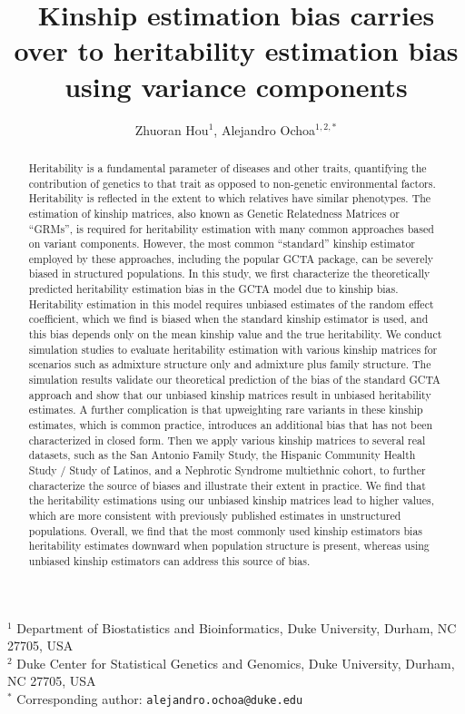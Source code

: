 \documentclass[11pt]{article}
\title{\Large \textbf{Kinship estimation bias carries over to heritability estimation bias using variance components}}
\author{Zhuoran Hou$^1$, Alejandro Ochoa$^{1,2,*}$}
\date{}
\begin{document}
\maketitle

\noindent
$^1$ Department of Biostatistics and Bioinformatics, Duke University, Durham, NC 27705, USA \\
$^2$ Duke Center for Statistical Genetics and Genomics, Duke University, Durham, NC 27705, USA \\
$^*$ Corresponding author: \texttt{alejandro.ochoa@duke.edu}


\begin{abstract}
Heritability is a fundamental parameter of diseases and other traits, quantifying the contribution of genetics to that trait as opposed to non-genetic environmental factors. Heritability is reflected in the extent to which relatives have similar phenotypes. The estimation of kinship matrices, also known as Genetic Relatedness Matrices or “GRMs”, is required for heritability estimation with many common approaches based on variant components. However, the most common “standard” kinship estimator employed by these approaches, including the popular GCTA package, can be severely biased in structured populations. In this study, we first characterize the theoretically predicted heritability estimation bias in the GCTA model due to kinship bias. Heritability estimation in this model requires unbiased estimates of the random effect coefficient, which we find is biased when the standard kinship estimator is used, and this bias depends only on the mean kinship value and the true heritability. We conduct simulation studies to evaluate heritability estimation with various kinship matrices for scenarios such as admixture structure only and admixture plus family structure. The simulation results validate our theoretical prediction of the bias of the standard GCTA approach and show that our unbiased kinship matrices result in unbiased heritability estimates. A further complication is that upweighting rare variants in these kinship estimates, which is common practice, introduces an additional bias that has not been characterized in closed form.  Then we apply various kinship matrices to several real datasets, such as the San Antonio Family Study, the Hispanic Community Health Study / Study of Latinos, and a Nephrotic Syndrome multiethnic cohort, to further characterize the source of biases and illustrate their extent in practice. We find that the heritability estimations using our unbiased kinship matrices lead to higher values, which are more consistent with previously published estimates in unstructured populations. Overall, we find that the most commonly used kinship estimators bias heritability estimates downward when population structure is present, whereas using unbiased kinship estimators can address this source of bias.
\end{abstract}
\end{document}
